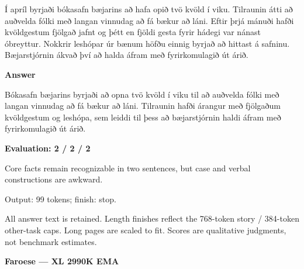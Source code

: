 \documentclass[10pt]{article}
\begin{document}
{\begin{minipage}{\textwidth}
\par\smallskip
Í apríl byrjaði bókasafn bæjarins að hafa opið tvö kvöld í viku. Tilraunin átti að auðvelda fólki með langan vinnudag að fá bækur að láni. Eftir þrjá mánuði hafði kvöldgestum fjölgað jafnt og þétt en fjöldi gesta fyrir hádegi var nánast óbreyttur. Nokkrir leshópar úr bænum höfðu einnig byrjað að hittast á safninu. Bæjarstjórnin ákvað því að halda áfram með fyrirkomulagið út árið.\par\smallskip
\textbf{Answer}\par Bókasafn bæjarins byrjaði að opna tvö kvöld í viku til að auðvelda fólki með langan vinnudag að fá bækur að láni. Tilraunin hafði árangur með fjölgaðum kvöldgestum og leshópa, sem leiddi til þess að bæjarstjórnin haldi áfram með fyrirkomulagið út árið.\par\smallskip
\textbf{Evaluation: 2 / 2 / 2}\par Core facts remain recognizable in two sentences, but case and verbal constructions are awkward.
\par {\color{gray} Output: 99 tokens; finish: stop.}\par
\medskip\footnotesize All answer text is retained. Length finishes reflect the 768-token story / 384-token other-task caps. Long pages are scaled to fit. Scores are qualitative judgments, not benchmark estimates.
\end{minipage}}%
\noindent\ifdim\dimexpr\ht\languagepage+\dp\languagepage\relax>0.93\textheight%
\resizebox*{!}{0.93\textheight}{\usebox{\languagepage}}%
\else\usebox{\languagepage}\fi%
\clearpage
{\Large\bfseries Faroese --- XL 2990K EMA}\par\smallskip
\end{document}
